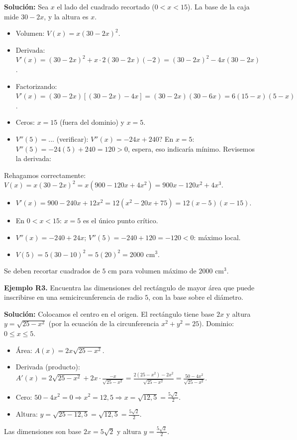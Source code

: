 \documentclass[12pt, letterpaper]{article}
\begin{document}
\begin{cuadrosolucion}
  \textbf{Solución:} Sea $x$ el lado del cuadrado recortado ($0 < x < 15$). La base de la caja mide $30 - 2x$, y la altura es $x$.
  \begin{itemize}
    \item Volumen: $V(x) = x(30 - 2x)^2$.
    \item Derivada: $V'(x) = (30 - 2x)^2 + x \cdot 2(30 - 2x)(-2) = (30 - 2x)^2 - 4x(30 - 2x)$.
    \item Factorizando: $V'(x) = (30 - 2x)[(30 - 2x) - 4x] = (30 - 2x)(30 - 6x) = 6(15 - x)(5 - x)$.
    \item Ceros: $x = 15$ (fuera del dominio) y $x = 5$.
    \item $V''(5) = ...$ (verificar): $V''(x) = -24x + 240$? En $x = 5$: $V''(5) = -24(5) + 240 = 120 > 0$, espera, eso indicaría mínimo. Revisemos la derivada:
  \end{itemize}

  Rehagamos correctamente: $V(x) = x(30 - 2x)^2 = x(900 - 120x + 4x^2) = 900x - 120x^2 + 4x^3$.
\end{cuadrosolucion}
\newpage
\begin{cuadrosolucion}
  \begin{itemize}
    \item $V'(x) = 900 - 240x + 12x^2 = 12(x^2 - 20x + 75) = 12(x - 5)(x - 15)$.
    \item En $0 < x < 15$: $x = 5$ es el único punto crítico.
    \item $V''(x) = -240 + 24x$; $V''(5) = -240 + 120 = -120 < 0$: máximo local.
    \item $V(5) = 5(30 - 10)^2 = 5(20)^2 = 2000$ cm$^3$.
  \end{itemize}
  Se deben recortar cuadrados de $5$ cm para volumen máximo de $2000$ cm$^3$.
\end{cuadrosolucion}

\textbf{Ejemplo R3.} Encuentra las dimensiones del rectángulo de mayor área que puede inscribirse en una semicircunferencia de radio $5$, con la base sobre el diámetro.

\begin{cuadrosolucion}
  \textbf{Solución:} Colocamos el centro en el origen. El rectángulo tiene base $2x$ y altura $y = \sqrt{25 - x^2}$ (por la ecuación de la circunferencia $x^2 + y^2 = 25$). Dominio: $0 \le x \le 5$.
  \begin{itemize}
    \item Área: $A(x) = 2x\sqrt{25 - x^2}$.
    \item Derivada (producto): $A'(x) = 2\sqrt{25 - x^2} + 2x \cdot \frac{-x}{\sqrt{25 - x^2}} = \frac{2(25 - x^2) - 2x^2}{\sqrt{25 - x^2}} = \frac{50 - 4x^2}{\sqrt{25 - x^2}}$.
    \item Cero: $50 - 4x^2 = 0 \Rightarrow x^2 = 12{,}5 \Rightarrow x = \sqrt{12{,}5} = \frac{5\sqrt{2}}{2}$.
    \item Altura: $y = \sqrt{25 - 12{,}5} = \sqrt{12{,}5} = \frac{5\sqrt{2}}{2}$.
  \end{itemize}
  Las dimensiones son base $2x = 5\sqrt{2}$ y altura $y = \frac{5\sqrt{2}}{2}$.
\end{cuadrosolucion}
\end{document}
